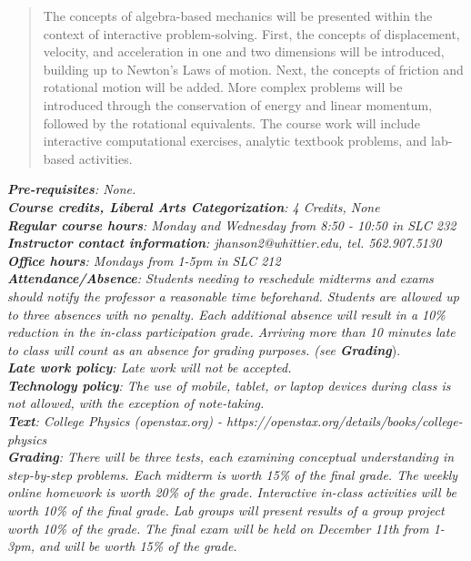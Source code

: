 \documentclass[10pt]{article}
\begin{document}
\maketitle

\begin{abstract}
The concepts of algebra-based mechanics will be presented within the context of interactive problem-solving.  First, the concepts of displacement, velocity, and acceleration in one and two dimensions will be introduced, building up to Newton's Laws of motion.  Next, the concepts of friction and rotational motion will be added.  More complex problems will be introduced through the conservation of energy and linear momentum, followed by the rotational equivalents.  The course work will include interactive computational exercises, analytic textbook problems, and lab-based activities.
\end{abstract}
\noindent
\textit{\textbf{Pre-requisites}: None.} \\
\textit{\textbf{Course credits, Liberal Arts Categorization}: 4 Credits, None} \\
\textit{\textbf{Regular course hours}: Monday and Wednesday from 8:50 - 10:50 in SLC 232} \\
\textit{\textbf{Instructor contact information}: jhanson2@whittier.edu, tel. 562.907.5130} \\
\textit{\textbf{Office hours}: Mondays from 1-5pm in SLC 212} \\
\textit{\textbf{Attendance/Absence}: Students needing to reschedule midterms and exams should notify the professor a reasonable time beforehand.  Students are allowed up to three absences with no penalty.  Each additional absence will result in a 10\% reduction in the in-class participation grade.  Arriving more than 10 minutes late to class will count as an absence for grading purposes. (see \textit{\textbf{Grading}}}). \\
\textit{\textbf{Late work policy}: Late work will not be accepted.} \\
\textit{\textbf{Technology policy}: The use of mobile, tablet, or laptop devices during class is not allowed, with the exception of note-taking.} \\
\textit{\textbf{Text}: College Physics (openstax.org) -  https://openstax.org/details/books/college-physics} \\
\textit{\textbf{Grading}: There will be three tests, each examining conceptual understanding in step-by-step problems.  Each midterm is worth 15\% of the final grade.  The weekly online homework is worth 20\% of the grade.  Interactive in-class activities will be worth 10\% of the final grade.  Lab groups will present results of a group project worth 10\% of the grade.  The final exam will be held on December 11th from 1-3pm, and will be worth 15\% of the grade.} \\
\end{document}
